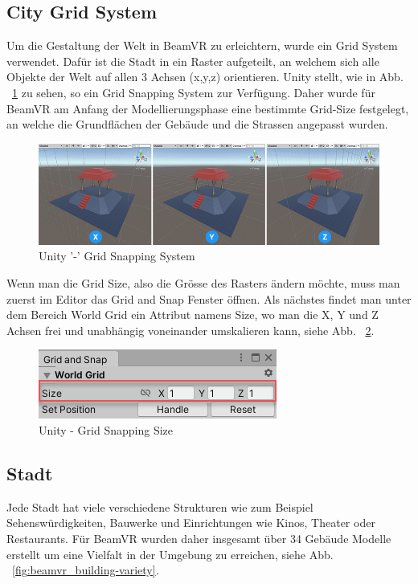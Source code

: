 \subsection{City Grid System}\label{subsec:city-grid-system}
Um die Gestaltung der Welt in BeamVR zu erleichtern, wurde ein Grid System verwendet.
Dafür ist die Stadt in ein Raster aufgeteilt, an welchem sich alle Objekte der Welt auf allen 3 Achsen (x,y,z) orientieren.
Unity stellt, wie in Abb. ~\ref{fig:grid-system-unity} zu sehen, so ein Grid Snapping System zur Verf\"ugung.
Daher wurde f\"ur BeamVR am Anfang der Modellierungsphase eine bestimmte Grid-Size festgelegt,
an welche die Grundfl\"achen der Geb\"aude und die Strassen
angepasst wurden.

\begin {figure}
    \centering
    \includegraphics[scale=0.5]{pics/unity-grid-snapping}
    \caption{Unity '-' Grid Snapping System}
    \label{fig:grid-system-unity}
\end {figure}

Wenn man die Grid Size, also die Gr\"osse des Rasters \"andern m\"ochte, muss man zuerst im Editor das Grid and Snap Fenster öffnen.
Als n\"achstes findet man unter dem Bereich World Grid ein Attribut namens Size, wo man die X, Y und Z Achsen frei und unabh\"angig voneinander umskalieren kann, siehe Abb. ~\ref{fig:grid-size-unity}.
~\cite{Unity_GridSnapping_2022}

\begin {figure}
    \centering
    \includegraphics{pics/unity-grid-snapping-size}
    \caption{Unity - Grid Snapping Size}
    \label{fig:grid-size-unity}
\end {figure}



\subsection{Stadt}\label{subsec:city}
Jede Stadt hat viele verschiedene Strukturen wie zum Beispiel Sehensw\"urdigkeiten, Bauwerke und Einrichtungen wie Kinos, Theater oder Restaurants.
F\"ur BeamVR wurden daher insgesamt \"uber 34 Geb\"aude Modelle erstellt um eine Vielfalt in der Umgebung zu erreichen, siehe Abb. ~\ref{fig:beamvr_building-variety}.

